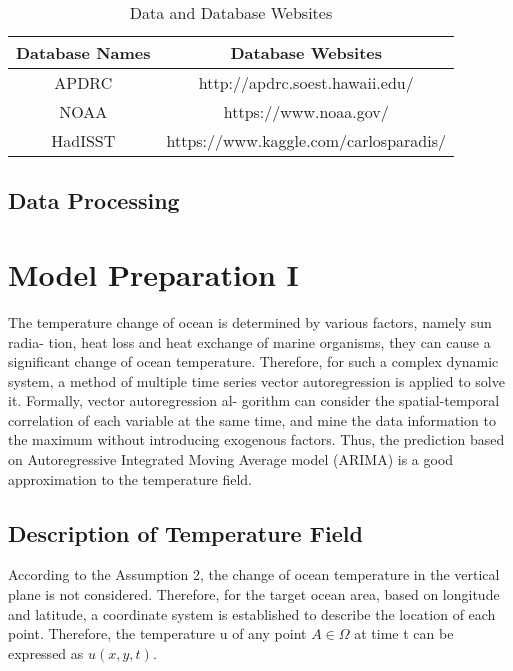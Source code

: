 \documentclass[12pt]{article}  %
\begin{document}
\begin{table}[htbp]
\begin{center}
\caption{Data and Database Websites}
\resizebox{\textwidth}{!}
{\begin{tabular}{c c}
\toprule[2pt]
\multicolumn{1}{m{5cm}}{\centering \textbf{Database Names}}
&\multicolumn{1}{m{10cm}}{\centering \textbf{Database Websites} }\\ %
\midrule
APDRC & http://apdrc.soest.hawaii.edu/ \\
NOAA & https://www.noaa.gov/ \\
HadISST & https://www.kaggle.com/carlosparadis/ \\ 
\bottomrule[2pt]
\end{tabular}}
\end{center}
\end{table}

\subsection{Data Processing}



\section{Model Preparation I}
The temperature change of ocean is determined by various factors, namely sun radia-
tion, heat loss and heat exchange of marine organisms, they can cause a significant change
of ocean temperature. Therefore, for such a complex dynamic system, a method of multiple
time series vector autoregression is applied to solve it. Formally, vector autoregression al-
gorithm can consider the spatial-temporal correlation of each variable at the same time, and
mine the data information to the maximum without introducing exogenous factors. Thus,
the prediction based on Autoregressive Integrated Moving Average model (ARIMA) is a
good approximation to the temperature field.

\subsection{Description of Temperature Field}
According to the Assumption 2, the change of ocean temperature in the vertical plane
is not considered. Therefore, for the target ocean area, based on longitude and latitude,
a coordinate system is established to describe the location of each point. Therefore, the
temperature u of any point $A \in \Omega $ at time t can be expressed as $u(x,y,t)$.
\end{document}

